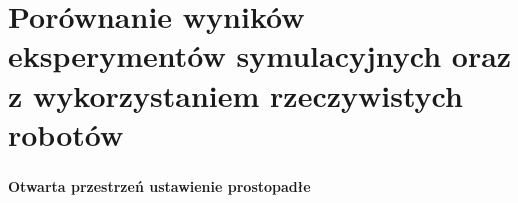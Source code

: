 \section*{Porównanie wyników eksperymentów symulacyjnych oraz z wykorzystaniem rzeczywistych robotów}
\begin{frame}
\frametitle{\secname}
\framesubtitle{Otwarta przestrzeń ustawienie prostopadłe}
\begin{figure}[ht] %
	\captionsetup[subfigure]{labelformat=empty}
	\centering
\end{figure}
\end{frame}


